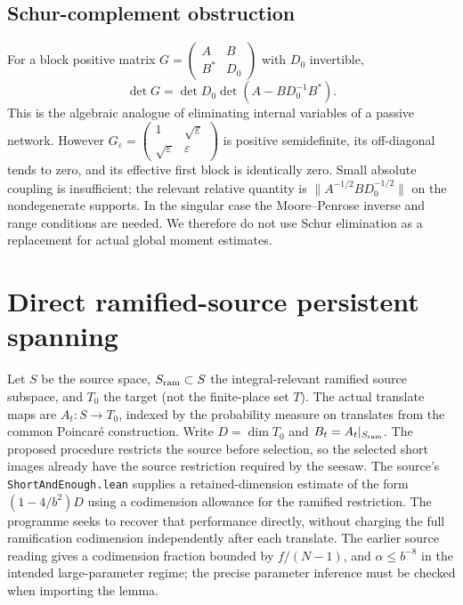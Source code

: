 \documentclass[11pt,a4paper]{article}
\begin{document}
\subsection{Schur-complement obstruction}
For a block positive matrix $G=\begin{pmatrix}A&B\\B^*&D_0\end{pmatrix}$ with $D_0$ invertible,
\begin{equation}\det G=\det D_0\det(A-BD_0^{-1}B^*).\end{equation}
This is the algebraic analogue of eliminating internal variables of a passive network. However $G_\varepsilon=\begin{pmatrix}1&\sqrt\varepsilon\\\sqrt\varepsilon&\varepsilon\end{pmatrix}$ is positive semidefinite, its off-diagonal tends to zero, and its effective first block is identically zero. Small absolute coupling is insufficient; the relevant relative quantity is $\|A^{-1/2}BD_0^{-1/2}\|$ on the nondegenerate supports. In the singular case the Moore--Penrose inverse and range conditions are needed. We therefore do not use Schur elimination as a replacement for actual global moment estimates.

\section{Direct ramified-source persistent spanning}\label{sec:spanning}
Let $S$ be the source space, $S_{\rm ram}\subset S$ the integral-relevant ramified source subspace, and $T_0$ the target (not the finite-place set $T$). The actual translate maps are $A_t:S\to T_0$, indexed by the probability measure on translates from the common Poincar\'e construction. Write $D=\dim T_0$ and $B_t=A_t|_{S_{\rm ram}}$. The proposed procedure restricts the source before selection, so the selected short images already have the source restriction required by the seesaw. The source's \texttt{ShortAndEnough.lean} supplies a retained-dimension estimate of the form $(1-4/b^2)D$ using a codimension allowance for the ramified restriction. The programme seeks to recover that performance directly, without charging the full ramification codimension independently after each translate. The earlier source reading gives a codimension fraction bounded by $f/(N-1)$, and $\alpha\leq b^{-8}$ in the intended large-parameter regime; the precise parameter inference must be checked when importing the lemma.
\end{document}
